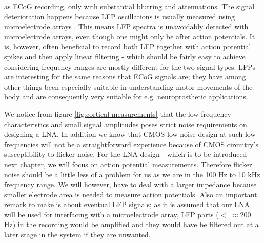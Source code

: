     as ECoG recording, only with substantial blurring and attenuations. The signal deterioration happens because LFP oscillations is usually measured using microelectrode arrays \cite{harrison2008design}. This means LFP spectra is unavoidably detected with microelectrode arrays, even though one might only be after action potentials. It is, however, often beneficial to record both LFP together with action potential spikes and then apply linear filtering - which should be fairly easy to achieve considering frequency ranges are mostly different for the two signal types. LFPs are interesting for the same reasons that ECoG signals are; they have among other things been especially suitable in understanding motor movements of the body \cite{donoghue1998neural} and are consequently very suitable for e.g. neuroprosthetic applications.
    
    We notice from figure \ref{fig:cortical-measurements} that the low frequency characteristics and small signal amplitudes poses strict 
    noise requirements on designing a \acl{LNA}. In addition we know that \acs{CMOS} low noise design at such low frequencies will not
    be a straightforward experience because of \acs{CMOS} circuitry's susceptibility to flicker noise. For the \acs{LNA} design - which is to be introduced
    next chapter, we will focus on action potential measurements. Therefore flicker noise should be a little less of a problem for us as we are in the 100 Hz to 10 kHz 
    frequency range. We will however, have to deal with a larger impedance because smaller electrode area is needed to measure action potentials.
    Also an important remark to make is about eventual LFP signals; as it is assumed that our LNA will be used for interfacing with a microelectrode array, LFP parts ($<$ $\approx$200 Hz) in the recording
    would be amplified and they would have be filtered out at a later stage in the system if they are unwanted.
    
